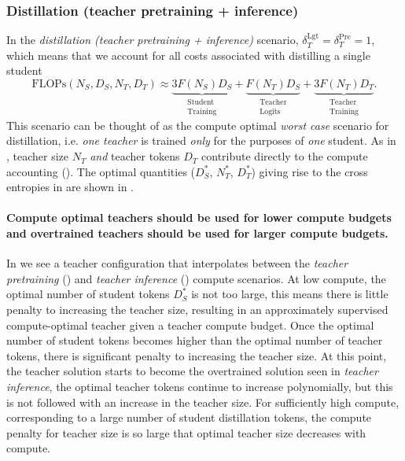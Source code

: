 \FloatBarrier
\subsubsection{Distillation (teacher pretraining + inference)}
\label{sssec:distillation-teacher-pretraining-inference}

In the \emph{distillation (teacher pretraining + inference)} scenario, 
$\delta_T^{\mathrm{Lgt}}=\delta_T^{\mathrm{Pre}}=1$,
which means that we account for all costs associated with distilling a single student 
\begin{equation}
    \mathrm{FLOPs}(N_S,D_S,N_T,D_T)\approx
    \underbrace{3F(N_S)D_S}_{\substack{\mathrm{Student}\\\mathrm{Training}}}
    +\underbrace{F(N_T)D_S}_{\substack{\mathrm{Teacher}\\\mathrm{Logits}}} + \underbrace{3F(N_T)D_T}_{\substack{\mathrm{Teacher}\\\mathrm{Training}}}.
    \label{eq:compute-teacher-pretraining-inference}
\end{equation}
This scenario can be thought of as the compute optimal \emph{worst case} scenario for distillation, i.e. \emph{one teacher} 
is trained \emph{only} for the purposes of \emph{one} student.
As in , teacher size $N_T$ \emph{and} teacher tokens $D_T$ contribute directly to the compute accounting ().
The optimal quantities ($D_S^*$, $N_T^*$, $D_T^*$) giving rise to the cross entropies in 
are shown in .

\paragraph{Compute optimal teachers should be used for lower compute budgets and overtrained teachers should be used for larger compute budgets.}
In 
we see a teacher configuration that interpolates between the \emph{teacher pretraining} ()
and \emph{teacher inference} () compute scenarios.
At low compute, the optimal number of student tokens $D_S^*$ is not too large, this means there is little penalty to increasing the teacher size,
resulting in an approximately supervised compute-optimal teacher given a teacher compute budget.
Once the optimal number of student tokens becomes higher than the optimal number of teacher tokens,
there is significant penalty to increasing the teacher size.
At this point, the teacher solution starts to become the overtrained solution seen in \emph{teacher inference},
the optimal teacher tokens continue to increase polynomially, but this is not followed with an increase in the teacher size.
For sufficiently high compute, corresponding to a large number of student distillation tokens, 
the compute penalty for teacher size is so large that optimal teacher size decreases with compute.

